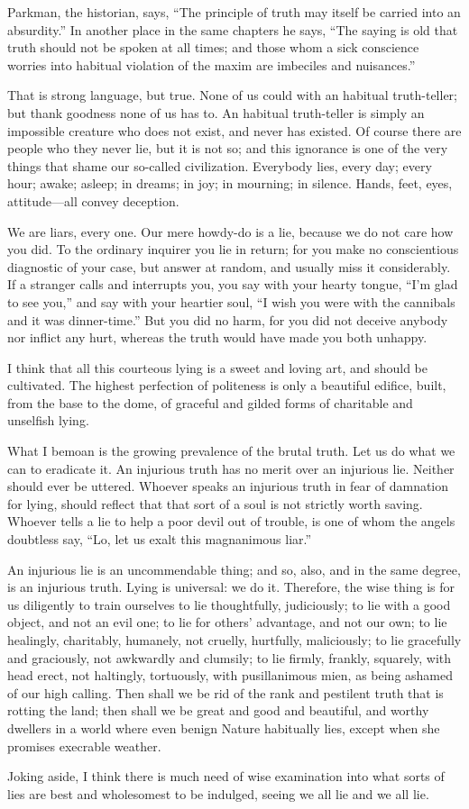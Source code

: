 \documentclass{novelette}
\begin{document}
Parkman, the historian, says,
``The principle of truth may itself be carried into an absurdity.'' In
another place in the same chapters he says, ``The saying is old that
truth should not be spoken at all times; and those whom a sick
conscience worries into habitual violation of the maxim are imbeciles
and nuisances.''

That is strong language, but true.
None of us could  with an habitual truth-teller;
but thank goodness none of us has to. An habitual truth-teller is simply
an impossible creature who does not exist, and never has existed.
Of course there are people who  they
never lie, but it is not so; and this ignorance is one of the very
things that shame our so-called civilization. Everybody lies, every day;
every hour; awake; asleep; in dreams; in joy; in mourning; in silence.
Hands, feet, eyes, attitude---all convey deception.

We are liars, every one. Our mere {howdy-do}
is a lie, because we do not care how you did.
To the ordinary inquirer you lie in return; for you make
no conscientious diagnostic of your case, but answer at random, and
usually miss it considerably. If a stranger calls and interrupts
you, you say with your hearty tongue, ``I'm glad to see you,'' and say
with your heartier soul, ``I wish you were with the cannibals and it was
dinner-time.'' But you did no harm, for you did not
deceive anybody nor inflict any hurt, whereas the truth would have made
you both unhappy.

I think that all this courteous lying is a sweet and loving art, and
should be cultivated. The highest perfection of politeness is only a
beautiful edifice, built, from the base to the dome, of graceful and
gilded forms of charitable and unselfish lying.

What I bemoan is the growing prevalence of the brutal truth. Let us do
what we can to eradicate it. An injurious truth has no merit over an
injurious lie. Neither should ever be uttered. Whoever speaks an
injurious truth in fear of damnation for lying, should
reflect that that sort of a soul is not strictly worth saving.
Whoever tells a lie to help a poor devil out of trouble, is one of whom the
angels doubtless say, ``Lo, let us exalt this magnanimous liar.''

An injurious lie is an uncommendable thing; and so, also, and in the same
degree, is an injurious truth. Lying is universal: we  do it.
Therefore, the wise thing is for us
diligently to train ourselves to lie thoughtfully, judiciously; to lie
with a good object, and not an evil one; to lie for others' advantage,
and not our own; to lie healingly, charitably, humanely, not cruelly,
hurtfully, maliciously; to lie gracefully and graciously, not awkwardly
and clumsily; to lie firmly, frankly, squarely, with head erect, not
haltingly, tortuously, with pusillanimous mien, as being ashamed of our
high calling. Then shall we be rid of the rank and pestilent truth that
is rotting the land; then shall we be great and good and beautiful, and
worthy dwellers in a world where even benign Nature habitually lies,
except when she promises execrable weather.

Joking aside, I think there is much need of wise examination into what
sorts of lies are best and wholesomest to be indulged, seeing we 
all lie and we  all lie.

\cleartoend
\end{document}
